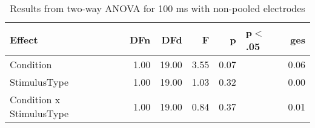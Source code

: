 \begin{table}[ht]
\centering
\begin{tabulary}{\textwidth}{lrrrrlr}
  \toprule
Effect & DFn & DFd & F & p & p$<$.05 & ges \\ 
  \midrule
Condition & 1.00 & 19.00 & 3.55 & 0.07 &  & 0.06 \\ 
  StimulusType & 1.00 & 19.00 & 1.03 & 0.32 &  & 0.00 \\ 
  Condition x StimulusType & 1.00 & 19.00 & 0.84 & 0.37 &  & 0.01 \\ 
   \bottomrule
\end{tabulary}
\caption{Results from two-way ANOVA for 100 ms with non-pooled electrodes} 
\end{table}
